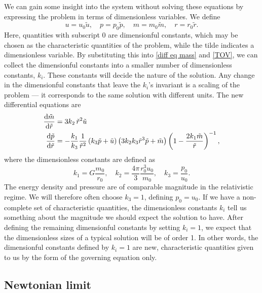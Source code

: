 We can gain some insight into the system without solving these equations by expressing the problem in terms of dimensionless variables.
We define
%
\begin{equation}
    u = u_0 \tilde u, \quad 
    p = p_0 \tilde p, \quad 
    m = m_0 \tilde m, \quad 
    r = r_0 \tilde r.
\end{equation}
%
Here, quantities with subscript $0$ are dimensionful constants, which may be chosen as the characteristic quantities of the problem, while the tilde indicates a dimensionless variable.
By substituting this into \autoref{diff eq mass} and \autoref{TOV}, we can collect the dimensionful constants into a smaller number of dimensionless constants, $k_i$.
These constants will decide the nature of the solution.
Any change in the dimensionful constants that leave the $k_i$'s invariant is a scaling of the problem --- it corresponds to the same solution with different units.
The new differential equations are
%
\begin{align}
    \label{mass relation dimensionless}
    \odv{ \tilde m}{\tilde r} & = 3 k_2\, \tilde r^2 \tilde u \\
    \label{TOV dimensionless}
    \odv{\tilde p}{\tilde r} & 
    = - \frac{k_1}{k_3} \frac{1}{\tilde r^2} \left(k_3\tilde p + \tilde u\right) 
    \left(3 k_2 k_3  \tilde r^3 \tilde p + \tilde m\right) 
    \left(1 - \frac{2 k_1  \tilde m}{\tilde r}\right)^{-1},
\end{align}
%
where the dimensionless constants are defined as
%
\begin{equation}
    \label{dimensionless constants TOV}
    k_1 = G \frac{m_0}{r_0}, \quad 
    k_2 =  \frac{4 \pi}{3} \frac{r_0^3 u_0}{m_0}, \quad
    k_3 = \frac{p_0}{u_0}.
\end{equation}
%
The energy density and pressure are of comparable magnitude in the relativistic regime.
We will therefore often choose $k_3 = 1$, defining $p_0 = u_0$.
If we have a non-complete set of characteristic quantities, the dimensionless constants $k_i$ tell us something about the magnitude we should expect the solution to have.
After defining the remaining dimensionful constants by setting $k_i = 1$, we expect that the dimensionless sizes of a typical solution will be of order 1.
In other words, the dimensionful constants defined by $k_i = 1$ are new, characteristic quantities given to us by the form of the governing equation only.





\subsection{Newtonian limit}

